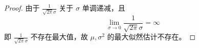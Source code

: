 \documentclass[normal,founder,mtpro2,cn]{elegantnote}
\begin{document}
\begin{enumerate}
\begin{proof}
            由于 $\frac{1}{\sqrt{2\pi}\sigma}$ 关于 $\sigma$ 单调递减，且
            \begin{equation*}
                \lim_{\sigma\rightarrow 0}\frac{1}{\sqrt{2\pi}\sigma}=\infty
            \end{equation*}
            即 $\frac{1}{\sqrt{2\pi}\sigma}$ 不存在最大值，故 $\mu,\sigma^{2}$ 的最大似然估计不存在。
        \end{proof}
\end{enumerate}
\end{document}
